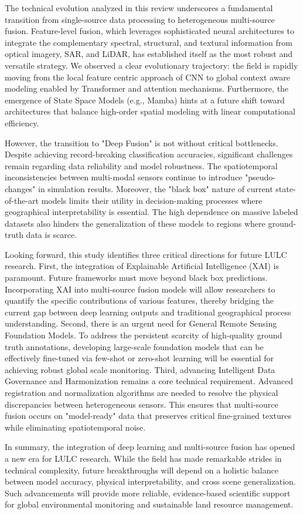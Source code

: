 \documentclass[]{interact}
\theoremstyle{plain}%
\theoremstyle{definition}
\theoremstyle{remark}
\begin{document}
The technical evolution analyzed in this review underscores a fundamental transition from single-source data processing to heterogeneous multi-source fusion. Feature-level fusion, which leverages sophisticated neural architectures to integrate the complementary spectral, structural, and textural information from optical imagery, SAR, and LiDAR, has established itself as the most robust and versatile strategy. We observed a clear evolutionary trajectory: the field is rapidly moving from the local feature centric approach of CNN to global context aware modeling enabled by Transformer and attention mechanisms. Furthermore, the emergence of State Space Models (e.g., Mamba) hints at a future shift toward architectures that balance high-order spatial modeling with linear computational efficiency.

However, the transition to "Deep Fusion" is not without critical bottlenecks. Despite achieving record-breaking classification accuracies, significant challenges remain regarding data reliability and model robustness. The spatiotemporal inconsistencies between multi-modal sensors continue to introduce "pseudo-changes" in simulation results. Moreover, the "black box" nature of current state-of-the-art models limits their utility in decision-making processes where geographical interpretability is essential. The high dependence on massive labeled datasets also hinders the generalization of these models to regions where ground-truth data is scarce.

Looking forward, this study identifies three critical directions for future LULC research. First, the integration of Explainable Artificial Intelligence (XAI) is paramount. Future frameworks must move beyond black box predictions. Incorporating XAI into multi-source fusion models will allow researchers to quantify the specific contributions of various features, thereby bridging the current gap between deep learning outputs and traditional geographical process understanding. Second, there is an urgent need for General Remote Sensing Foundation Models. To address the persistent scarcity of high-quality ground truth annotations, developing large-scale foundation models that can be effectively fine-tuned via few-shot or zero-shot learning will be essential for achieving robust global scale monitoring. Third, advancing Intelligent Data Governance and Harmonization remains a core technical requirement. Advanced registration and normalization algorithms are needed to resolve the physical discrepancies between heterogeneous sensors. This ensures that multi-source fusion occurs on "model-ready" data that preserves critical fine-grained textures while eliminating spatiotemporal noise.

In summary, the integration of deep learning and multi-source fusion has opened a new era for LULC research. While the field has made remarkable strides in technical complexity, future breakthroughs will depend on a holistic balance between model accuracy, physical interpretability, and cross scene generalization. Such advancements will provide more reliable, evidence-based scientific support for global environmental monitoring and sustainable land resource management.




\end{document}
